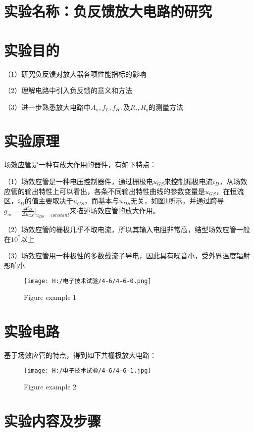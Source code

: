 \documentclass{article}
\begin{document}
	\section{ 实验名称：负反馈放大电路的研究}
    \section{ 实验目的}
     （1）研究负反馈对放大器各项性能指标的影响\par
	           （2）理解电路中引入负反馈的意义和方法\par
               （3）进一步熟悉放大电路中$A_u,f_L,f_H,$及$R_i,R_o$的测量方法\par
			   \section{ 实验原理}
    场效应管是一种有放大作用的器件，有如下特点：\par
   
（1）场效应管是一种电压控制器件，通过栅极电$u_{GS}$来控制漏极电流$i_D$，从场效应管的输出特性上可以看出，各条不同输出特性曲线的参数变量是$u_{GS}$，在恒流区，$i_D$的值主要取决于$u_{GS}$，而基本与$u_{DS}$无关，如图1所示，并通过跨导$g_m=\frac{\Delta  i_D}{\Delta  u_{GS}}{\bigg |}_{u_{DS}=constant}$来描述场效应管的放大作用。\par
（2）场效应管的栅极几乎不取电流，所以其输入电阻非常高，结型场效应管一般在$10^7$以上\par
（3）场效应管用一种极性的多数载流子导电，因此具有噪音小，受外界温度辐射影响小
  \begin{figure}[h]
	\centering
	  \texttt{[image: H:/电子技术试验/4-6/4-6-0.png]}
	\caption{Figure example 1} 
  \end{figure}
	

\section{ 实验电路}
基于场效应管的特点，得到如下共栅极放大电路：\par
\begin{figure}[h]
	\centering
	\texttt{[image: H:/电子技术试验/4-6/4-6-1.jpg]}
	\caption{Figure example 2} \label{fig:aa}
\end{figure}
\section{ 实验内容及步骤}
\end{document}
